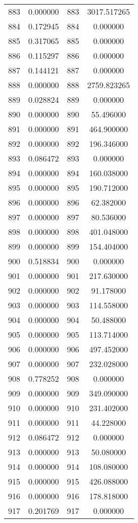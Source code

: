 \documentclass[12pt]{article}
\begin{document}
\begin{longtable}{@{}cccc@{}}
883 & 0.000000 & 883 & 3017.517265 \\
884 & 0.172945 & 884 & 0.000000 \\
885 & 0.317065 & 885 & 0.000000 \\
886 & 0.115297 & 886 & 0.000000 \\
887 & 0.144121 & 887 & 0.000000 \\
888 & 0.000000 & 888 & 2759.823265 \\
889 & 0.028824 & 889 & 0.000000 \\
890 & 0.000000 & 890 & 55.496000 \\
891 & 0.000000 & 891 & 464.900000 \\
892 & 0.000000 & 892 & 196.346000 \\
893 & 0.086472 & 893 & 0.000000 \\
894 & 0.000000 & 894 & 160.038000 \\
895 & 0.000000 & 895 & 190.712000 \\
896 & 0.000000 & 896 & 62.382000 \\
897 & 0.000000 & 897 & 80.536000 \\
898 & 0.000000 & 898 & 401.048000 \\
899 & 0.000000 & 899 & 154.404000 \\
900 & 0.518834 & 900 & 0.000000 \\
901 & 0.000000 & 901 & 217.630000 \\
902 & 0.000000 & 902 & 91.178000 \\
903 & 0.000000 & 903 & 114.558000 \\
904 & 0.000000 & 904 & 50.488000 \\
905 & 0.000000 & 905 & 113.714000 \\
906 & 0.000000 & 906 & 497.452000 \\
907 & 0.000000 & 907 & 232.028000 \\
908 & 0.778252 & 908 & 0.000000 \\
909 & 0.000000 & 909 & 349.090000 \\
910 & 0.000000 & 910 & 231.402000 \\
911 & 0.000000 & 911 & 44.228000 \\
912 & 0.086472 & 912 & 0.000000 \\
913 & 0.000000 & 913 & 50.080000 \\
914 & 0.000000 & 914 & 108.080000 \\
915 & 0.000000 & 915 & 426.088000 \\
916 & 0.000000 & 916 & 178.818000 \\
917 & 0.201769 & 917 & 0.000000 \\

\end{longtable}
\end{document}
